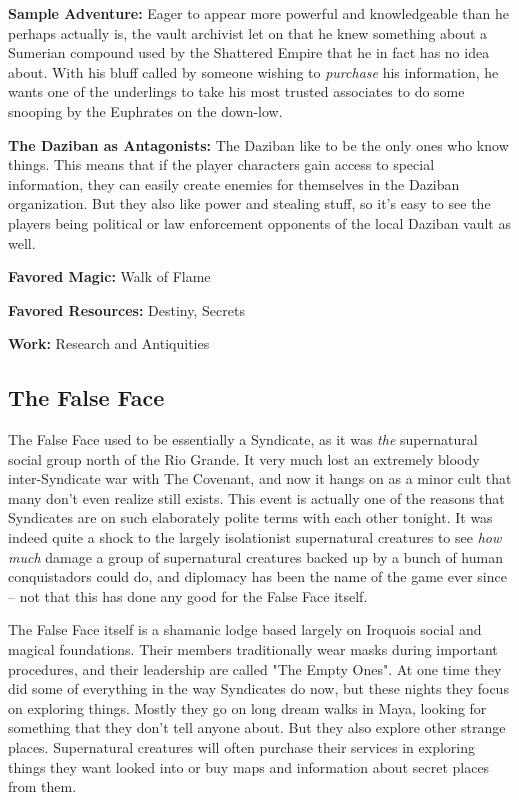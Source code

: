 \textbf{Sample Adventure:} Eager to appear more powerful and knowledgeable than he perhaps actually is, the vault archivist let on that he knew something about a Sumerian compound used by the Shattered Empire that he in fact has no idea about. With his bluff called by someone wishing to \textit{purchase} his information, he wants one of the underlings to take his most trusted associates to do some snooping by the Euphrates on the down-low.

\textbf{The Daziban as Antagonists:} The Daziban like to be the only ones who know things. This means that if the player characters gain access to special information, they can easily create enemies for themselves in the Daziban organization. But they also like power and stealing stuff, so it's easy to see the players being political or law enforcement opponents of the local Daziban vault as well.

\textbf{Favored Magic:} Walk of Flame

\textbf{Favored Resources:} Destiny, Secrets

\textbf{Work:} Research and Antiquities

\subsection{The False Face} 

The False Face used to be essentially a Syndicate, as it was \textit{the} supernatural social group north of the Rio Grande. It very much lost an extremely bloody inter-Syndicate war with The Covenant, and now it hangs on as a minor cult that many don't even realize still exists. This event is actually one of the reasons that Syndicates are on such elaborately polite terms with each other tonight. It was indeed quite a shock to the largely isolationist supernatural creatures to see \textit{how much} damage a group of supernatural creatures backed up by a bunch of human conquistadors could do, and diplomacy has been the name of the game ever since -- not that this has done any good for the False Face itself.

The False Face itself is a shamanic lodge based largely on Iroquois social and magical foundations. Their members traditionally wear masks during important procedures, and their leadership are called "The Empty Ones". At one time they did some of everything in the way Syndicates do now, but these nights they focus on exploring things. Mostly they go on long dream walks in Maya, looking for something that they don't tell anyone about. But they also explore other strange places. Supernatural creatures will often purchase their services in exploring things they want looked into or buy maps and information about secret places from them.

